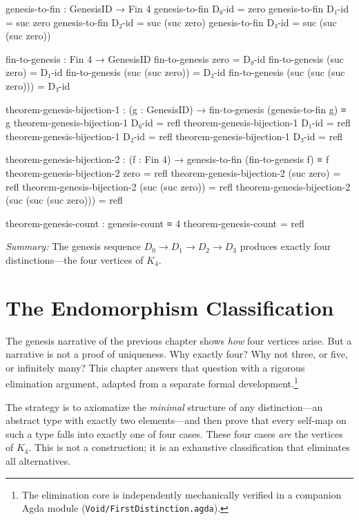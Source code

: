 \documentclass[11pt,a4paper]{book}
\begin{document}
\begin{code}
genesis-to-fin : GenesisID → Fin 4
genesis-to-fin D₀-id = zero
genesis-to-fin D₁-id = suc zero
genesis-to-fin D₂-id = suc (suc zero)
genesis-to-fin D₃-id = suc (suc (suc zero))

fin-to-genesis : Fin 4 → GenesisID
fin-to-genesis zero = D₀-id
fin-to-genesis (suc zero) = D₁-id
fin-to-genesis (suc (suc zero)) = D₂-id
fin-to-genesis (suc (suc (suc zero))) = D₃-id

theorem-genesis-bijection-1 : (g : GenesisID) → fin-to-genesis (genesis-to-fin g) ≡ g
theorem-genesis-bijection-1 D₀-id = refl
theorem-genesis-bijection-1 D₁-id = refl
theorem-genesis-bijection-1 D₂-id = refl
theorem-genesis-bijection-1 D₃-id = refl

theorem-genesis-bijection-2 : (f : Fin 4) → genesis-to-fin (fin-to-genesis f) ≡ f
theorem-genesis-bijection-2 zero = refl
theorem-genesis-bijection-2 (suc zero) = refl
theorem-genesis-bijection-2 (suc (suc zero)) = refl
theorem-genesis-bijection-2 (suc (suc (suc zero))) = refl

theorem-genesis-count : genesis-count ≡ 4
theorem-genesis-count = refl
\end{code}

\medskip
\noindent\textit{Summary:} The genesis sequence $D_0 \to D_1 \to D_2 \to D_3$ produces exactly 
four distinctions—the four vertices of $K_4$.

\chapter{The Endomorphism Classification}
\label{chap:endomorphism-classification}

The genesis narrative of the previous chapter shows \emph{how} four vertices arise.
But a narrative is not a proof of uniqueness. Why exactly four? Why not three, or five,
or infinitely many? This chapter answers that question with a rigorous elimination
argument, adapted from a separate formal development.\footnote{The elimination core
is independently mechanically verified in a companion Agda module
(\texttt{Void/FirstDistinction.agda}).}

The strategy is to axiomatize the \emph{minimal} structure of any distinction—an
abstract type with exactly two elements—and then prove that every self-map on such
a type falls into exactly one of four cases. These four cases \emph{are} the vertices
of $K_4$. This is not a construction; it is an exhaustive classification that eliminates
all alternatives.
\end{document}
